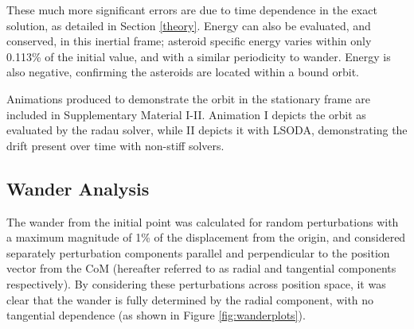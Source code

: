 \documentclass[11pt, a4paper,twocolumn]{article} %
\begin{document}
These much more significant errors are due to time dependence in the exact solution, as detailed in Section \ref{theory}. Energy can also be evaluated, and conserved, in this inertial frame; asteroid specific energy varies within only 0.113\% of the initial value, and with a similar periodicity to wander. Energy is also negative, confirming the asteroids are located within a bound orbit.

Animations produced to demonstrate the orbit in the stationary frame are included in Supplementary Material I-II. Animation I depicts the orbit as evaluated by the radau solver, while II depicts it with LSODA, demonstrating the drift present over time with non-stiff solvers.

\subsection{Wander Analysis} \label{perturbed}
The wander from the initial point was calculated for random perturbations with a maximum magnitude of 1\% of the displacement from the origin, and considered  separately perturbation components parallel and perpendicular to the position vector from the CoM (hereafter referred to as radial and tangential components respectively). By considering these perturbations across position space, it was clear that the wander is fully determined by the radial component, with no tangential dependence (as shown in Figure \ref{fig:wanderplots}).
\end{document}
